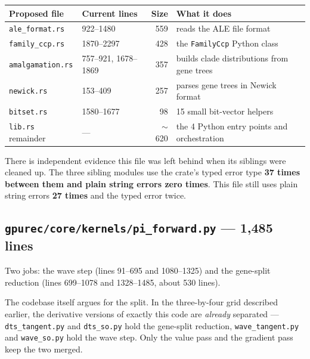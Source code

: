 \documentclass[11pt]{article}
\newcommand{\dir}[1]{\nolinkurl{#1}}
\begin{document}
\begin{center}
\begin{tabular}{@{}llr p{}@{}}
\toprule
Proposed file & Current lines & Size & What it does \\
\midrule
\texttt{ale\_format.rs}   & 922--1480              & 559 & reads the ALE file format \\
\texttt{family\_ccp.rs}   & 1870--2297             & 428 & the \texttt{FamilyCcp} Python class \\
\texttt{amalgamation.rs}  & 757--921, 1678--1869   & 357 & builds clade distributions from gene trees \\
\texttt{newick.rs}        & 153--409               & 257 & parses gene trees in Newick format \\
\texttt{bitset.rs}        & 1580--1677             &  98 & 15 small bit-vector helpers \\
\midrule
\texttt{lib.rs} remainder & ---                    & $\sim$620 & the 4 Python entry points and orchestration \\
\bottomrule
\end{tabular}
\end{center}

There is independent evidence this file was left behind when its siblings were
cleaned up.  The three sibling modules use the crate's typed error type
\textbf{37 times between them and plain string errors zero times}.  This file
still uses plain string errors \textbf{27 times} and the typed error twice.

\subsection{\texorpdfstring{\dir{gpurec/core/kernels/pi\_forward.py}}{pi\_forward.py} --- 1{,}485 lines}

Two jobs: the wave step (lines 91--695 and 1080--1325) and the gene-split
reduction (lines 699--1078 and 1328--1485, about 530 lines).

The codebase itself argues for the split.  In the three-by-four grid described
earlier, the derivative versions of exactly this code are \emph{already}
separated --- \dir{dts\_tangent.py} and \dir{dts\_so.py} hold the gene-split
reduction, \dir{wave\_tangent.py} and \dir{wave\_so.py} hold the wave step.
Only the value pass and the gradient pass keep the two merged.
\end{document}
